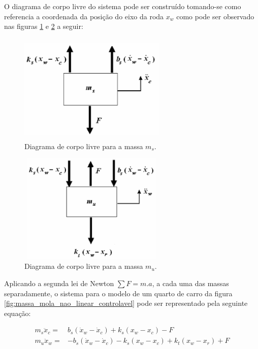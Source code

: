 O diagrama de corpo livre do sistema pode ser construído tomando-se como referencia a coordenada da posição do eixo da roda $x_w$ como pode ser observado nas figuras \ref{fig:corpo_livre_ms} e \ref{fig:corpo_livre_mu} a seguir:
\FloatBarrier
\begin{figure}[htbp]
    \begin{centering}
      \includegraphics[width=7cm,height=5.25cm]{img/corpo_livre_ms.png}
      \caption{Diagrama de corpo livre para a massa $m_s$.} 
      \label{fig:corpo_livre_ms}
    \end{centering}
\end{figure}
\FloatBarrier
\begin{figure}[htbp]
  \begin{centering}
    \includegraphics[width=7cm,height=5.25cm]{img/corpo_livre_mu.png}
    \caption{Diagrama de corpo livre para a massa $m_u$.} 
    \label{fig:corpo_livre_mu}
  \end{centering}
\end{figure}
\FloatBarrier
  
Aplicando a segunda lei de Newton $\sum{F}=m.a$, a cada uma das massas separadamente, o sistema para o modelo de um quarto de carro da figura \ref{fig:massa_mola_nao_linear_controlavel} pode ser representado pela seguinte equação:
  
\begin{equation} \label{eq:massa_mola_linear}
  \begin{split}
    m_{s} \ddot{x}_{c} =& b_{s}(\dot{x}_{w}-\dot{x}_{c}) + k_{s}(x_{w}-x_{c}) - F\ \\
    m_{u} \ddot{x}_{w} =& -b_{s}(\dot{x}_{w}-\dot{x}_{c}) - k_{s}(x_{w}-x_{c})+k_{t}(x_{w}-x_{r}) + F
  \end{split}
\end{equation}
  
